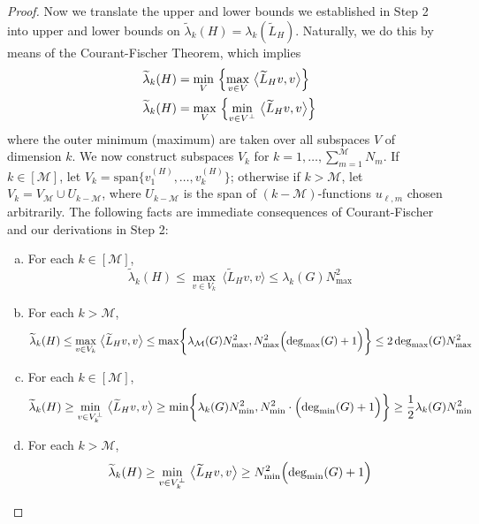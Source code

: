 \documentclass{article}
\newcommand{\1}{\mathbf{1}}
\newcommand{\wt}[1]{\widetilde{#1}}
\newcommand{\mc}[1]{\mathcal{#1}}
\theoremstyle{alden}
\theoremstyle{aldenthm}
\theoremstyle{definition}
\theoremstyle{remark}
\begin{document}
\begin{proof}
Now we translate the upper and lower bounds we established in Step 2 into upper and lower bounds on $\wt{\lambda}_k(H) = \lambda_k(\wt{L}_H)$. Naturally, we do this by means of the Courant-Fischer Theorem, which implies
\begin{align*}
\wt{\lambda}_k(H) & = \min_{V}~ \Bigl\{\max_{v \in V} ~\bigl \langle \wt{L}_Hv , v \bigr \rangle \Bigr\} \\
\wt{\lambda}_k(H) & = \max_{V}~ \Bigl\{\min_{v \in V^{\perp}}~ \bigl \langle \wt{L}_Hv , v \bigr \rangle \Bigr\}
\end{align*}
where the outer minimum (maximum) are taken over all subspaces $V$ of dimension $k$. We now construct subspaces $V_k$ for $k = 1,\ldots, \sum_{m = 1}^{\mc{M}} N_m$. If $k \in [\mc{M}]$, let $V_k = \mathrm{span}\{v_1^{(H)}, \ldots, v_k^{(H)}\}$; otherwise if $k > \mc{M}$, let $V_k = V_{\mc{M}} \cup U_{k - \mc{M}}$, where $U_{k - \mc{M}}$ is the span of $(k - \mc{M})$-functions $u_{\ell,m}$ chosen arbitrarily. The following facts are immediate consequences of Courant-Fischer and our derivations in Step 2:
\begin{enumerate}[(a)]
	\item For each $k \in [\mc{M}]$,
	\begin{equation*}
	\wt{\lambda}_k(H) \leq \max_{v \in V_k} ~\bigl \langle \wt{L}_Hv , v \bigr \rangle \leq \lambda_k(G) N_{\max}^2 
	\end{equation*}
	\item For each $k > \mc{M}$,
	\begin{equation*}
	\wt{\lambda}_k(H) \leq \max_{v \in V_k} ~\bigl \langle \wt{L}_Hv , v \bigr \rangle \leq \max \biggl\{ \lambda_{\mc{M}}(G) N_{\max}^2, N_{\max}^2 \Bigl(\deg_{\max}(G) + 1\Bigr)  \biggr\} \leq 2 \deg_{\max}(G) N_{\max}^2
	\end{equation*}
	\item For each $k \in [\mc{M}]$,
	\begin{equation*}
	\wt{\lambda}_k(H) \geq \min_{v \in V_k^{\perp}} ~\bigl \langle \wt{L}_Hv , v \bigr \rangle \geq \min\biggl\{\lambda_k(G) N_{\min}^2 , N_{\min}^2 \cdot \Bigl(\deg_{\min}(G) + 1\Bigr) \biggr\} \geq \frac{1}{2}\lambda_k(G) N_{\min}^2
	\end{equation*}
	\item For each $k > \mc{M}$,
	\begin{equation*}
	\wt{\lambda}_k(H) \geq \min_{v \in V_k^{\perp}} ~\bigl \langle \wt{L}_Hv , v \bigr \rangle \geq N_{\min}^2 \Bigl(\deg_{\min}(G) + 1\Bigr)
	\end{equation*}
\end{enumerate}
	

\end{proof}
\end{document}
